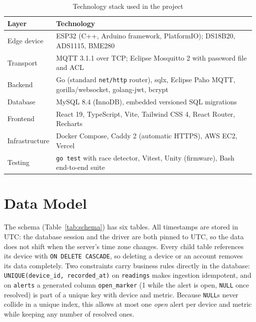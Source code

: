 \documentclass[11pt,a4paper,oneside]{report}
\newcommand{\code}[1]{\texttt{#1}}
\begin{document}
\begin{table}[htbp]
\centering
\caption{Technology stack used in the project}
\label{tab:stack}
\small
\begin{tabularx}{\linewidth}{@{}lX@{}}
\toprule
\textbf{Layer} & \textbf{Technology} \\
\midrule
Edge device    & ESP32 (C++, Arduino framework, PlatformIO); DS18B20, ADS1115, BME280 \\
Transport      & MQTT 3.1.1 over TCP; Eclipse Mosquitto 2 with password file and ACL \\
Backend        & Go (standard \code{net/http} router), sqlx, Eclipse Paho MQTT, gorilla/websocket, golang-jwt, bcrypt \\
Database       & MySQL 8.4 (InnoDB), embedded versioned SQL migrations \\
Frontend       & React 19, TypeScript, Vite, Tailwind CSS 4, React Router, Recharts \\
Infrastructure & Docker Compose, Caddy 2 (automatic HTTPS), AWS EC2, Vercel \\
Testing        & \code{go test} with race detector, Vitest, Unity (firmware), Bash end-to-end suite \\
\bottomrule
\end{tabularx}
\end{table}

\section{Data Model}
\label{sec:datamodel}
The schema (Table~\ref{tab:schema}) has six tables. All timestamps are stored in UTC:
the database session and the driver are both pinned to UTC, so the data does not shift
when the server's time zone changes. Every child table references its device with
\code{ON DELETE CASCADE}, so deleting a device or an account removes its data
completely. Two constraints carry business rules directly in the database:
\code{UNIQUE(device\_id, recorded\_at)} on \code{readings} makes ingestion idempotent,
and on \code{alerts} a generated column \code{open\_marker} (1 while the alert is open,
\code{NULL} once resolved) is part of a unique key with device and metric. Because
\code{NULL}s never collide in a unique index, this allows at most one \emph{open} alert
per device and metric while keeping any number of resolved ones.
\end{document}
